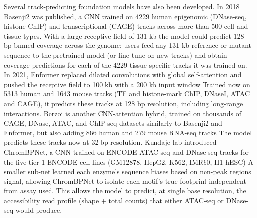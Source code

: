 
Several track-predicting foundation models have also been developed. In 2018 Basenji2 was published, a CNN trained on \num{4229} human epigenomic (DNase-seq, histone-ChIP) and transcriptional (CAGE) tracks across more than 500 cell and tissue types. With a large receptive field of 131 kb the model could predict 128-bp binned coverage across the genome: users feed any 131-kb reference or mutant sequence to the pretrained model (or fine-tune on new tracks) and obtain coverage predictions for each of the \num{4229} tissue-specific tracks it was trained on. In 2021, Enformer replaced dilated convolutions with global self-attention and pushed the receptive field to 100 kb with a 200 kb input window Trained now on \num{5313} human and \num{1643} mouse tracks (TF and histone-mark ChIP, DNaseI, ATAC and CAGE), it predicts these tracks at 128 bp resolution, including long-range interactions. Borzoi is another CNN-attention hybrid, trained on thousands of CAGE, DNase, ATAC, and ChIP-seq datasets similarly to Basenji2 and Enformer, but also adding 866 human and 279 mouse RNA-seq tracks The model predicts these tracks now at 32 bp-resolution. Kundaje lab introduced ChromBPNet, a CNN trained on ENCODE ATAC-seq and DNase-seq tracks for the five tier 1 ENCODE cell lines (GM12878, HepG2, K562, IMR90, H1-hESC) A smaller sub-net learned each enzyme's sequence biases based on non-peak regions signal, allowing ChromBPNet to isolate each motif's true footprint independent from assay used. This allows the model to predict, at single base resolution, the accessibility read profile (shape + total counts) that either ATAC-seq or DNase-seq would produce.

